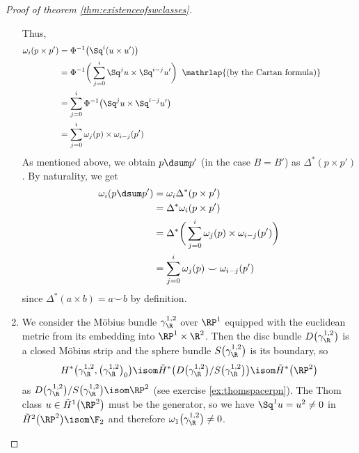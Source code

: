 \begin{proof}[Proof of theorem \ref{thm:existenceofswclasses}]
\begin{enumerate}
			Thus,
			\begin{align*}
				\omega_i(p \times p') &= \Phi^{-1}\big(\Sq^i (u \times u')\big) \\ 
									  &= \Phi^{-1}\bigg(\sum_{j = 0}^i \Sq^j u \times \Sq^{i - j} u'\bigg) \;\;\mathrlap{\text{(by the Cartan formula)}}\qquad\qquad\qquad \\
									  &= \sum_{j = 0}^i \Phi^{-1}\big(\Sq^j u \times \Sq^{i - j} u'\big) \\
									  &= \sum_{j = 0}^i \omega_j(p) \times \omega_{i - j}(p')
			\end{align*}
			As mentioned above, we obtain $p \dsum p'$ (in the case $B = B'$) as $\Delta^*(p \times p')$.
			By naturality, we get 
			\begin{align*}
				\omega_i(p \dsum p') &= \omega_i \Delta^*(p \times p') \\
									 &= \Delta^* \omega_i(p \times p') \\
									 &= \Delta^*\bigg(\sum_{j = 0}^i \omega_j(p) \times \omega_{i - j}(p')\bigg) \\
									 &= \sum_{j = 0}^i \omega_j(p) \smile \omega_{i - j}(p')
			\end{align*}
			since $\Delta^*(a \times b) = a \smile b$ by definition.
		\item We consider the Möbius bundle $\gamma_\R^{1, 2}$ over $\RP^1$ equipped with the euclidean metric from its embedding into $\RP^1 \times \R^2$.
			Then the disc bundle $D\big(\gamma_\R^{1, 2}\big)$ is a closed Möbius strip and the sphere bundle $S\big(\gamma_\R^{1, 2}\big)$ is its boundary, so 
			\begin{equation*}
				H^*\big(\gamma_\R^{1, 2}, \big(\gamma_\R^{1, 2}\big)_0\big) \isom \tilde{H}^*\big(D\big(\gamma_\R^{1, 2}\big) / S\big(\gamma_\R^{1, 2}\big)\big) \isom \tilde{H}^*\big(\RP^2\big)
			\end{equation*}
			as $D\big(\gamma_\R^{1, 2}\big) / S\big(\gamma_\R^{1, 2}\big) \isom \RP^2$ (see exercise \ref{ex:thomspacerpn}).
			The Thom class $u \in \tilde{H}^1\big(\RP^2\big)$ must be the generator, so we have $\Sq^1 u = u^2 \neq 0$ in $\tilde{H}^2\big(\RP^2\big) \isom \F_2$ and therefore $\omega_1\big(\gamma_\R^{1, 2}\big) \neq 0$.
			\qedhere
	\end{enumerate}
\end{proof}

